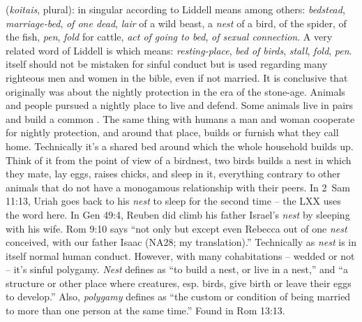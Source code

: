 \item[Nests (multiple),]

(\textit{koitais}, plural):
 in singular according to Liddell means among others: \emph{bedstead}, \emph{marriage-bed}, \emph{of one dead}, \emph{lair} of a wild beast, a \emph{nest} of a bird, of the spider, of the fish, \emph{pen}, \emph{fold} for cattle, \emph{act of going to bed}, \emph{of sexual connection}. A very related word of Liddell is  which means: \emph{resting-place}, \emph{bed of birds}, \emph{stall}, \emph{fold}, \emph{pen}.  itself should not be mistaken for sinful conduct but is used regarding many righteous men and women in the bible, even if not married. It is conclusive that  originally was about the nightly protection in the era of the stone-age. Animals and people pursued a nightly place to live and defend. Some animals live in pairs and build a common . The same thing with humans a man and woman cooperate for nightly protection, and around that place, builds or furnish what they call home. Technically it's a shared bed around which the whole household builds up. Think of it from the point of view of a birdnest, two birds builds a nest in which they mate, lay eggs, raises chicks, and sleep in it, everything contrary to other animals that do not have a monogamous relationship with their peers. In 2~Sam 11:13, Uriah goes back to his \emph{nest} to sleep for the second time -- the LXX uses the word  here. In Gen 49:4, Reuben did climb his father Israel's \emph{nest} by sleeping with his wife. Rom 9:10 says ``not only but except even Rebecca out of one \emph{nest} conceived, with our father Isaac (NA28; my translation).'' Technically  as \emph{nest} is in itself normal human conduct. However, with many cohabitations -- wedded or not -- it's sinful polygamy. \emph{Nest} defines as ``to build a nest, or live in a nest,'' and ``a structure or other place where creatures, esp. birds, give birth or leave their eggs to develop.'' Also, \emph{polygamy} defines as ``the custom or condition of being married to more than one person at the same time.''
Found in Rom 13:13.

